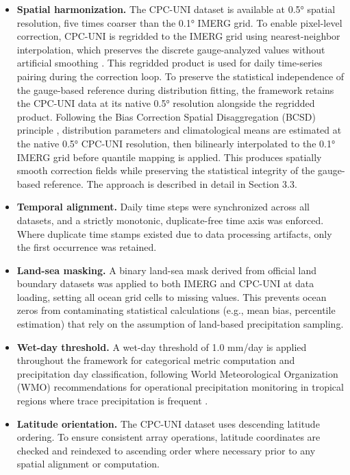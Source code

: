 \documentclass[11pt,a4paper]{article}
\begin{document}
\begin{itemize}
\item
  \textbf{Spatial harmonization.} The CPC-UNI dataset is available at
  0.5° spatial resolution, five times coarser than the 0.1° IMERG grid.
  To enable pixel-level correction, CPC-UNI is regridded to the IMERG
  grid using nearest-neighbor interpolation, which preserves the
  discrete gauge-analyzed values without artificial smoothing \cite{ref13}.
  This regridded product is used for daily time-series pairing during
  the correction loop. To preserve the statistical independence of the
  gauge-based reference during distribution fitting, the framework
  retains the CPC-UNI data at its native 0.5° resolution alongside the
  regridded product. Following the Bias Correction Spatial
  Disaggregation (BCSD) principle \cite{ref23}, distribution parameters and
  climatological means are estimated at the native 0.5° CPC-UNI
  resolution, then bilinearly interpolated to the 0.1° IMERG grid before
  quantile mapping is applied. This produces spatially smooth correction
  fields while preserving the statistical integrity of the gauge-based
  reference. The approach is described in detail in Section 3.3.
\item
  \textbf{Temporal alignment.} Daily time steps were synchronized across
  all datasets, and a strictly monotonic, duplicate-free time axis was
  enforced. Where duplicate time stamps existed due to data processing
  artifacts, only the first occurrence was retained.
\item
  \textbf{Land-sea masking.} A binary land-sea mask derived from
  official land boundary datasets was applied to both IMERG and CPC-UNI
  at data loading, setting all ocean grid cells to missing values. This
  prevents ocean zeros from contaminating statistical calculations
  (e.g., mean bias, percentile estimation) that rely on the assumption
  of land-based precipitation sampling.
\item
  \textbf{Wet-day threshold.} A wet-day threshold of 1.0 mm/day is
  applied throughout the framework for categorical metric computation
  and precipitation day classification, following World Meteorological
  Organization (WMO) recommendations for operational precipitation
  monitoring in tropical regions where trace precipitation is frequent
  \cite{ref24}.
\item
  \textbf{Latitude orientation.} The CPC-UNI dataset uses descending
  latitude ordering. To ensure consistent array operations, latitude
  coordinates are checked and reindexed to ascending order where
  necessary prior to any spatial alignment or computation.
\end{itemize}
\end{document}
